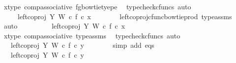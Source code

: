 \begin{isabellebody}
\ x{\isacharunderscore}{\kern0pt}type{}\ comp{\isacharunderscore}{\kern0pt}associative{}\ fg{\isacharunderscore}{\kern0pt}bowtie{\isacharunderscore}{\kern0pt}tyepe\ \isamarkupfalse%
\ {\isacharparenleft}{\kern0pt}typecheck{\isacharunderscore}{\kern0pt}cfuncs{\isacharcomma}{\kern0pt}\ auto{\isacharparenright}{\kern0pt}\isanewline
\ \ \ \ \isamarkupfalse%
\ \isamarkupfalse%
\ \ {\isachardoublequoteopen}{\isachardot}{\kern0pt}{\isachardot}{\kern0pt}{\isachardot}{\kern0pt}\ {\isacharequal}{\kern0pt}\ \ {\isacharparenleft}{\kern0pt}left{\isacharunderscore}{\kern0pt}coproj\ Y\ W\ {\isasymcirc}\isactrlsub c\ f{\isacharparenright}{\kern0pt}\ {\isasymcirc}\isactrlsub c\ x{\isachardoublequoteclose}\isanewline
\ \ \ \ \ \ \isamarkupfalse%
\ left{\isacharunderscore}{\kern0pt}coproj{\isacharunderscore}{\kern0pt}cfunc{\isacharunderscore}{\kern0pt}bowtie{\isacharunderscore}{\kern0pt}prod\ type{\isacharunderscore}{\kern0pt}assms\ \isamarkupfalse%
\ auto\isanewline
\ \ \ \ \isamarkupfalse%
\ \isamarkupfalse%
\ {\isachardoublequoteopen}{\isachardot}{\kern0pt}{\isachardot}{\kern0pt}{\isachardot}{\kern0pt}\ {\isacharequal}{\kern0pt}\ left{\isacharunderscore}{\kern0pt}coproj\ Y\ W\ {\isasymcirc}\isactrlsub c\ f\ {\isasymcirc}\isactrlsub c\ x{\isachardoublequoteclose}\isanewline
\ \ \ \ \ \ \isamarkupfalse%
\ x{\isacharunderscore}{\kern0pt}type{}\ comp{\isacharunderscore}{\kern0pt}associative{}\ type{\isacharunderscore}{\kern0pt}assms{\isacharparenleft}{\kern0pt}{}{\isacharparenright}{\kern0pt}\ \isamarkupfalse%
\ {\isacharparenleft}{\kern0pt}typecheck{\isacharunderscore}{\kern0pt}cfuncs{\isacharcomma}{\kern0pt}\ auto{\isacharparenright}{\kern0pt}\isanewline
\ \ \ \ \isamarkupfalse%
\ \isamarkupfalse%
\ {\isachardoublequoteopen}{\isachardot}{\kern0pt}{\isachardot}{\kern0pt}{\isachardot}{\kern0pt}\ {\isacharequal}{\kern0pt}\ left{\isacharunderscore}{\kern0pt}coproj\ Y\ W\ {\isasymcirc}\isactrlsub c\ f\ {\isasymcirc}\isactrlsub c\ y{\isachardoublequoteclose}\isanewline
\ \ \ \ \ \ \isamarkupfalse%
\ {\isacharparenleft}{\kern0pt}simp\ add{\isacharcolon}{\kern0pt}\ eqs{\isacharparenright}{\kern0pt}\isanewline
\ \ \ \ \isamarkupfalse%
\ \isamarkupfalse%
\ {\isachardoublequoteopen}{\isachardot}{\kern0pt}{\isachardot}{\kern0pt}{\isachardot}{\kern0pt}\ {\isacharequal}{\kern0pt}\ {\isacharparenleft}{\kern0pt}left{\isacharunderscore}{\kern0pt}coproj\ Y\ W\ {\isasymcirc}\isactrlsub c\ f{\isacharparenright}{\kern0pt}\ {\isasymcirc}\isactrlsub c\ y{\isachardoublequoteclose}\isanewline

\end{isabellebody}
